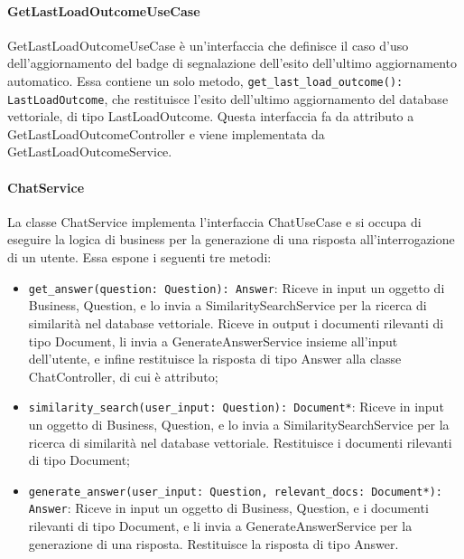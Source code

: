 \paragraph{GetLastLoadOutcomeUseCase}
\label{sec:get_last_load_outcome_use_case}
GetLastLoadOutcomeUseCase è un'interfaccia che definisce il caso d'uso dell'aggiornamento del badge di segnalazione dell'esito dell'ultimo aggiornamento automatico. Essa contiene un solo metodo, \texttt{get\_last\_load\_outcome(): LastLoadOutcome}, che restituisce l'esito dell'ultimo aggiornamento del database vettoriale, di tipo LastLoadOutcome. Questa interfaccia fa da attributo a GetLastLoadOutcomeController e viene implementata da GetLastLoadOutcomeService.

\newpage


\label{sec:service_backend}

\paragraph{ChatService}
\label{sec:chat_service}
La classe ChatService implementa l'interfaccia ChatUseCase e si occupa di eseguire la logica di business per la generazione di una risposta all'interrogazione di un utente.
Essa espone i seguenti tre metodi:
\begin{itemize}
    \item \texttt{get\_answer(question: Question): Answer}: Riceve in input un oggetto di Business, Question, e lo invia a SimilaritySearchService per la ricerca di similarità nel database vettoriale. Riceve in output i documenti rilevanti di tipo Document, li invia a GenerateAnswerService insieme all'input dell'utente, e infine restituisce la risposta di tipo Answer alla classe ChatController, di cui è attributo;
    \item \texttt{similarity\_search(user\_input: Question): Document*}: Riceve in input un oggetto di Business, Question, e lo invia a SimilaritySearchService per la ricerca di similarità nel database vettoriale. Restituisce i documenti rilevanti di tipo Document;
    \item \texttt{generate\_answer(user\_input: Question, relevant\_docs: Document*): Answer}: Riceve in input un oggetto di Business, Question, e i documenti rilevanti di tipo Document, e li invia a GenerateAnswerService per la generazione di una risposta. Restituisce la risposta di tipo Answer.
\end{itemize}

